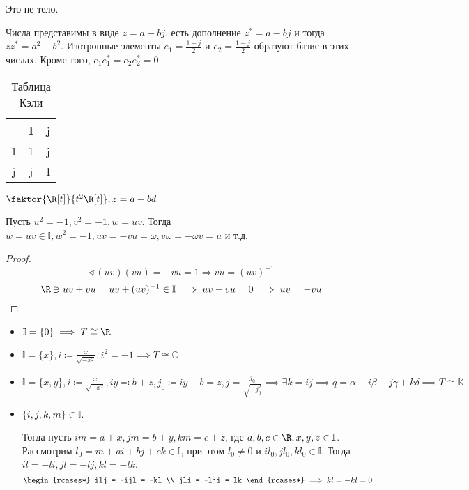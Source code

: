 \begin{example}
	Это не тело.

	Числа представимы в виде \(z = a + bj\), есть дополнение \(z^* = a - bj\) и тогда \(zz^* = a^2 - b^2\). Изотропные элементы \(e_1 = \frac{1+j}{2}\) и \(e_2 = \frac{1-j}{2}\) образуют базис в этих числах. Кроме того, \(e_1 e_1^* = e_2 e_2^* = 0\)
	\begin{table}[h]
		\caption{Таблица Кэли}
		\centering
		\begin{tabular}{C|C|C}
			  & 1 & j \\  & 1 & j \\ \hline
			j & j & 1 \\
		\end{tabular}
	\end{table}
\end{example}

\begin{example}
	\(\faktor{\R[t]}{t^2 \R[t]}, z = a + bd\)
\end{example}

\begin{lemma}
	Пусть \(u^2 = - 1, v^2 =- 1, w = uv\). Тогда \(w = uv \in \mathbb{I}, w^2 =- 1, uv = -vu = \omega, v \omega = - \omega v = u\) и т.д.
\end{lemma}
\begin{proof}
	\[\sphericalangle (uv)(vu) = - vu = 1 \Rightarrow vu = (uv)^{-1}\]
	\[\R \ni uv + vu = uv + (uv)^{-1} \in \mathbb{I} \implies uv - vu = 0 \implies uv = -vu\]
\end{proof}

\begin{theorem}\itemfix
	\begin{itemize}
		\item \(\mathbb{I} = \{0\} \implies T \cong \R\)
		\item \(\mathbb{I} = \{x\}, i \coloneqq \frac{x}{\sqrt{-x^2}}, i^2 = -1 \implies T \cong \mathbb{C}\)
		\item \(\mathbb{I} = \{x, y\}, i \coloneqq \frac{x}{\sqrt{-x^2}}, iy \eqqcolon b + z, j_0 \coloneqq iy - b = z, j = \frac{j_0}{\sqrt{-j_0^2}} \implies \exists k = ij \implies q = \alpha + i \beta + j \gamma + k \delta \implies T \cong \mathbb{K}\)
		\item \(\{i, j, k, m\} \in \mathbb{I}\).

		      Тогда пусть \(im = a + x, jm = b + y, km = c + z\), где \(a, b, c \in \R, x, y, z \in \mathbb{I}\).
		      Рассмотрим \(l_0 = m + ai + bj + ck \in \mathbb{I}\), при этом \(l_0 \neq 0\) и \(il_0, jl_0, kl_0 \in \mathbb{I}\). Тогда \(il = -li, jl = -lj, kl = -lk\).
		      \[
                  \begin{rcases*}
                      ilj = -ijl = -kl \\
                      jli = -lji = lk
                  \end{rcases*} \implies kl = -kl = 0
              \]
	\end{itemize}
\end{theorem}
